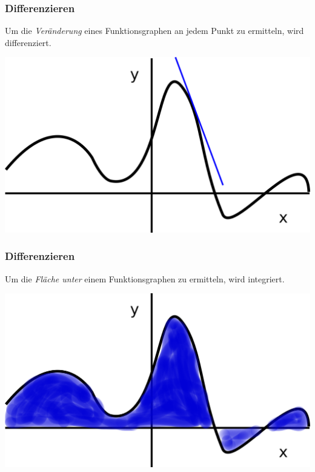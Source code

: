 \documentclass{beamer}
\begin{document}
\begin{frame}
\frametitle{Differenzieren}

Um die \emph{Veränderung} eines Funktionsgraphen an jedem Punkt zu ermitteln, wird differenziert.

\begin{center}
\includegraphics{function_diff.png}
\end{center}


\end{frame}


\begin{frame}
\frametitle{Differenzieren}

Um die \emph{Fläche unter} einem Funktionsgraphen zu ermitteln, wird integriert.

\begin{center}
\includegraphics{function_int.png}
\end{center}


\end{frame}
\end{document}
